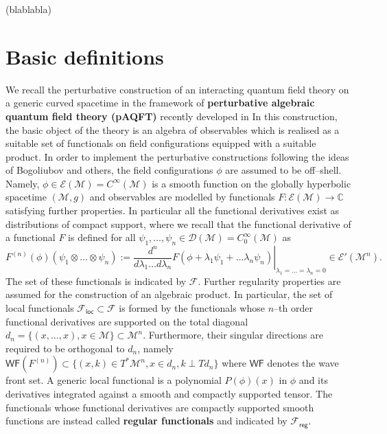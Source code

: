 \documentclass[10pt]{book}
\newcommand{\WF}{\mathsf{WF}}
\newcommand{\loc}{\mathsf{loc}}
\newcommand{\reg}{\mathsf{reg}}
\newcommand{\Dcal}{\mathcal{D}}
\newcommand{\Mcal}{\mathcal{M}}
\theoremstyle{break}
\begin{document}
(blablabla)


\section{Basic definitions}

We recall the perturbative construction of an interacting quantum field theory on a generic curved spacetime in  the framework of {\bf perturbative algebraic quantum field theory (pAQFT)} recently developed in  %
In this construction, the basic object of the theory is an algebra of observables which is realised as a suitable set of functionals on field configurations equipped with a suitable product.
In order to implement the perturbative constructions following the ideas of Bogoliubov and others, the field configurations $\phi$ are assumed to be off--shell. Namely, $\phi\in\mathcal{E}(\Mcal)=C^\infty(\Mcal)$ is a smooth function on the globally hyperbolic spacetime $(\Mcal,g)$ and observables are modelled by functionals $F:\mathcal{E}(\Mcal)\to \mathbb{C}$ satisfying further properties. In particular all the functional derivatives exist as distributions of compact support, where we recall that the functional derivative of a functional $F$ is defined for all $\psi_1,\ldots,\psi_n\in \Dcal(\Mcal)=C_0^\infty(\Mcal)$ as
\[ 
F^{(n)}(\phi)(\psi_1\otimes \dots \otimes \psi_n) :=  \left.\frac{d^n}{d\lambda_1    \dots d\lambda_n } F(\phi + \lambda_1 \psi_1 +\dots \lambda_n \psi_n)\right|_{\lambda_1 = \dots=\lambda_n=0} \in \mathcal{E}'(\Mcal^n).
\]
The set of these functionals is indicated by $\mathcal{F}$. 
Further regularity properties are assumed for the construction of an algebraic product.  In particular, the set of local functionals $\mathcal{F}_\loc\subset \mathcal{F}$ is formed by the functionals whose $n$--th order functional derivatives are supported on the total diagonal $d_n = \{(x,\dots, x) , x\in \Mcal\}\subset \Mcal^n $. Furthermore, their singular directions are required to be orthogonal to $d_n$, namely $\WF(F^{(n)})\subset \{ (x,k) \in T^*\Mcal^n, x\in d_n, k \perp  T d_n \}$ where $\WF$ denotes the wave front set. A generic local functional is a polynomial $P(\phi)(x)$ in $\phi$ and its derivatives integrated against a smooth and compactly supported tensor. The functionals whose functional derivatives are compactly supported smooth functions are instead called {\bf regular functionals} and indicated by $\mathcal{F}_\reg$.
\end{document}

